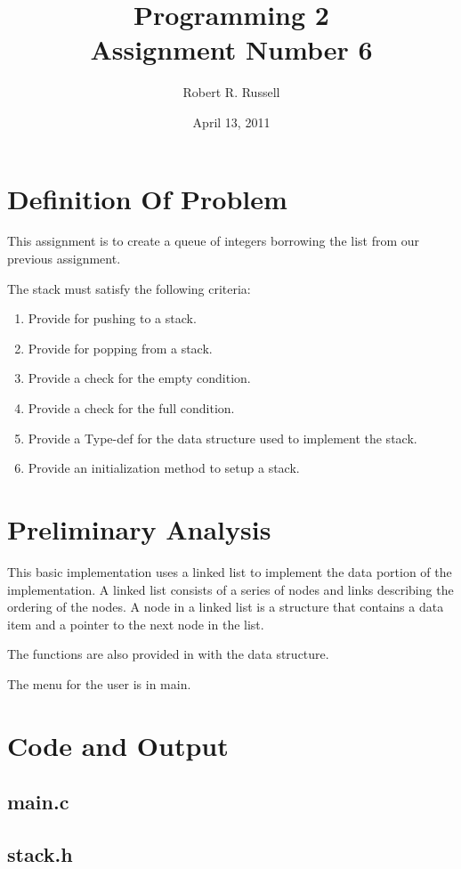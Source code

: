 \documentclass[letterpaper,oneside]{scrartcl}
\title{Programming 2\\Assignment Number 6}
\author{Robert R. Russell}
\date{April 13, 2011}
\begin{document}
\maketitle

\section{Definition Of Problem}
This assignment is to create a queue of integers borrowing the list from our
previous assignment.

The stack must satisfy the following criteria:
\begin{enumerate}
\item Provide for pushing to a stack.
\item Provide for popping from a stack.
\item Provide a check for the empty condition.
\item Provide a check for the full condition.
\item Provide a Type-def for the data structure used to implement the stack.
\item Provide an initialization method to setup a stack.
\end{enumerate}

\section{Preliminary Analysis}

This basic implementation uses a linked list to implement the data portion of the implementation.
A linked list consists of a series of nodes and links describing the ordering of the nodes.
A node in a linked list is a structure that contains a data item and a pointer to the next node in the list.

The functions are also provided in with the data structure.

The menu for the user is in main.

\section{Code and Output}

\subsection{main.c}

\subsection{stack.h}
\end{document}
